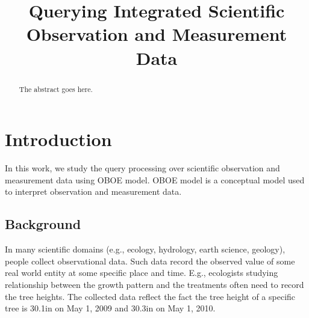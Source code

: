 \documentclass[conference]{IEEEtran}
\begin{document}
\title{Querying Integrated Scientific Observation and Measurement Data}

\author{
\and
{}
\and
{}
}

\maketitle


\begin{abstract}
The abstract goes here.
\end{abstract}


\section{Introduction}
In this work, we study the query processing over scientific
observation and measurement data using OBOE
model\cite{DBLP:conf/er/BowersMS08}. OBOE model is a conceptual model
used to interpret observation and measurement data. 

\subsection{Background}

In many scientific domains (e.g., ecology, hydrology, earth science,
geology), people collect observational data. Such data
record the observed value of some real world entity at some specific
place and time. E.g., ecologists studying relationship between the 
growth pattern and the treatments often need to record the tree
heights. The collected data reflect the fact the tree height of a
specific tree is 30.1in on May 1, 2009 and 30.3in on May 1, 2010. 
\end{document}
